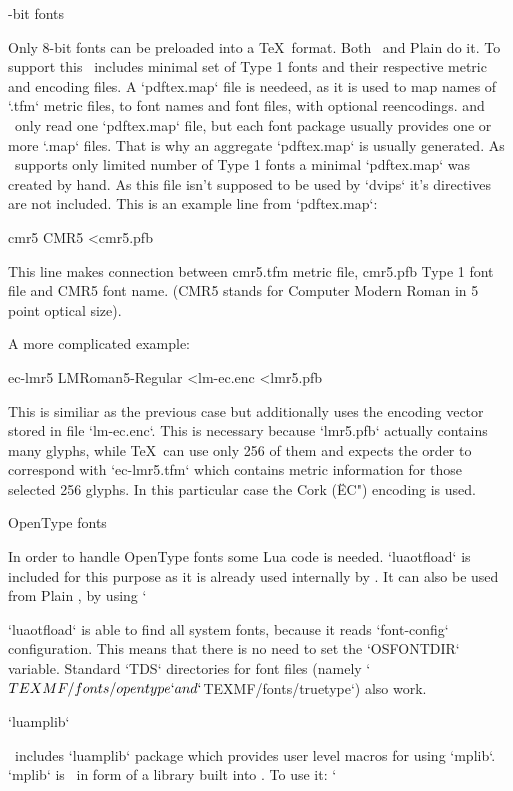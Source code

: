 -bit fonts

Only 8-bit fonts can be preloaded into a \TeX\ format. Both \OpTeX\ and Plain
do it. To support this \MMTeX\ includes minimal set of Type 1 fonts and their
respective metric and encoding files. A `pdftex.map` file is needeed, as it is
used to map names of `.tfm` metric files, to font names and font files, with
optional reencodings. \pdfTeX and \LuaTeX\ only read one `pdftex.map` file, but
each font package usually provides one or more `.map` files. That is why an
aggregate `pdftex.map` is usually generated. As \MMTeX\ supports only limited
number of Type 1 fonts a minimal `pdftex.map` was created by hand. As this file
isn't supposed to be used by `dvips` it's directives are not included. This is
an example line from `pdftex.map`:

\begtt
cmr5 CMR5 <cmr5.pfb
\endtt

This line makes connection between cmr5.tfm metric file, cmr5.pfb Type 1 font
file and CMR5 font name. (CMR5 stands for Computer Modern Roman in 5 point
optical size).

A more complicated example:

\begtt
ec-lmr5 LMRoman5-Regular <lm-ec.enc <lmr5.pfb
\endtt

This is similiar as the previous case but additionally uses the encoding vector
stored in file `lm-ec.enc`. This is necessary because `lmr5.pfb` actually
contains many glyphs, while \TeX\ can use only 256 of them and expects the
order to correspond with `ec-lmr5.tfm` which contains metric information for
those selected 256 glyphs. In this particular case the Cork (\"EC") encoding is
used.

\secc OpenType fonts

In order to handle OpenType fonts some Lua code is needed. `luaotfload` is
included for this purpose as it is already used internally by \OpTeX. It can
also be used from Plain \LuaTeX, by using `

`luaotfload` is able to find all system fonts, because it reads `font-config`
configuration. This means that there is no need to set the `OSFONTDIR`
variable. Standard `TDS` directories for font files (namely
`$TEXMF/fonts/opentype` and `$TEXMF/fonts/truetype`) also work.

\sec `luamplib`

\MMTeX\ includes `luamplib` package which provides user level macros for using
`mplib`. `mplib` is \Metapost\ in form of a library built into \LuaTeX. To use
it: `

